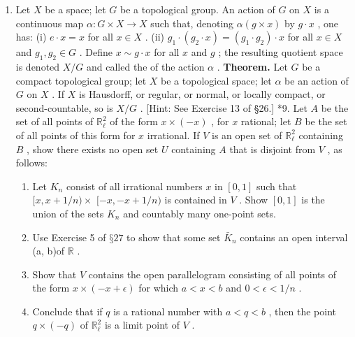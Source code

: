 \begin{enumerate}[itemsep=0.4em, parsep=0pt, topsep=0pt, partopsep=0pt, leftmargin=*, label=\arabic*., ref=\arabic*]
\begin{enumerate}[itemsep=0.2em, parsep=0pt, topsep=0pt, partopsep=0pt, leftmargin=*, label=(\alph*), align=left]
  \end{enumerate}
\item Let \(X\) be a space; let \(G\) be a topological group. An  action of \(G\) on \(X\) is a continuous map \(\alpha  : G \times  X \rightarrow  X\) such that, denoting \(\alpha \left( {g \times  x}\right)\) by \(g \cdot  x\) , one has: (i) \(e \cdot  x = x\) for all \(x \in  X\) . (ii) \({g}_{1} \cdot  \left( {{g}_{2} \cdot  x}\right)  = \left( {{g}_{1} \cdot  {g}_{2}}\right)  \cdot  x\) for all \(x \in  X\) and \({g}_{1},{g}_{2} \in  G\) . Define \(x \sim  g \cdot  x\) for all \(x\) and \(g\) ; the resulting quotient space is denoted \(X/G\) and called the  of the action \(\alpha\) . \textbf{Theorem.} Let \(G\) be a compact topological group; let \(X\) be a topological space; let \(\alpha\) be an action of \(G\) on \(X\) . If \(X\) is Hausdorff, or regular, or normal, or locally compact, or second-countable, so is \(X/G\) . [Hint: See Exercise 13 of §26.] *9. Let \(A\) be the set of all points of \({\mathbb{R}}_{\ell }^{2}\) of the form \(x \times  \left( {-x}\right)\) , for \(x\) rational; let \(B\) be the set of all points of this form for \(x\) irrational. If \(V\) is an open set of \({\mathbb{R}}_{\ell }^{2}\) containing \(B\) , show there exists no open set \(U\) containing \(A\) that is disjoint from \(V\) , as follows:
  \begin{enumerate}[itemsep=0.2em, parsep=0pt, topsep=0pt, partopsep=0pt, leftmargin=*, label=(\alph*), align=left]
  \item Let \({K}_{n}\) consist of all irrational numbers \(x\) in \(\left\lbrack  {0,1}\right\rbrack\) such that \(\lbrack x,x + 1/n) \times\)  \(\lbrack  - x, - x + 1/n)\) is contained in \(V\) . Show \(\left\lbrack  {0,1}\right\rbrack\) is the union of the sets \({K}_{n}\) and countably many one-point sets.
  \item Use Exercise 5 of \(§{27}\) to show that some set \({\bar{K}}_{n}\) contains an open interval (a, b)of \(\mathbb{R}\) .
  \item Show that \(V\) contains the open parallelogram consisting of all points of the form \(x \times  \left( {-x + \epsilon }\right)\) for which \(a < x < b\) and \(0 < \epsilon  < 1/n\) .
  \item Conclude that if \(q\) is a rational number with \(a < q < b\) , then the point \(q \times  \left( {-q}\right)\) of \({\mathbb{R}}_{\ell }^{2}\) is a limit point of \(V\) . 
  \end{enumerate}
\end{enumerate}
